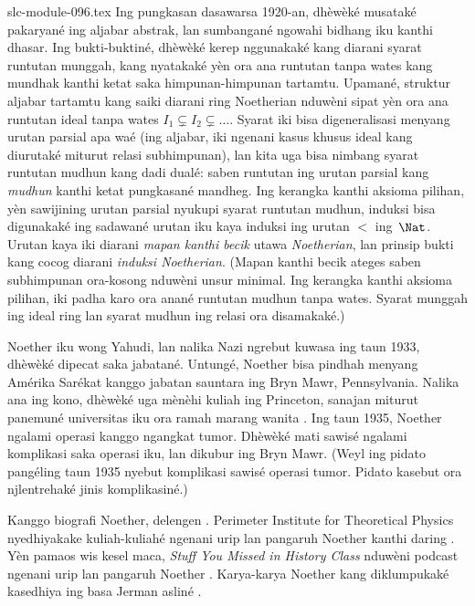 \begin{filecontents*}[overwrite]{slc-module-096.tex}
Ing pungkasan dasawarsa 1920-an,
dhèwèké musataké pakaryané ing
aljabar abstrak, lan sumbangané
ngowahi bidhang iku kanthi dhasar.
Ing bukti-buktiné, dhèwèké kerep
nggunakaké kang diarani syarat
runtutan munggah, kang nyatakaké
yèn ora ana runtutan tanpa wates
kang mundhak kanthi ketat saka
himpunan-himpunan tartamtu. Upamané,
struktur aljabar tartamtu kang
saiki diarani ring Noetherian
nduwèni sipat yèn ora ana
runtutan ideal tanpa wates
$I_1 \subsetneq I_2 \subsetneq \dots$.
Syarat iki bisa digeneralisasi
menyang urutan parsial apa waé
(ing aljabar, iki ngenani kasus
khusus ideal kang diurutaké
miturut relasi subhimpunan), lan
kita uga bisa nimbang syarat
runtutan mudhun kang dadi dualé:
saben runtutan ing urutan parsial
kang \emph{mudhun} kanthi ketat
pungkasané mandheg. Ing kerangka kanthi aksioma pilihan, yèn sawijining
urutan parsial nyukupi syarat
runtutan mudhun, induksi bisa
digunakaké ing sadawané urutan
iku kaya induksi ing urutan
$<$ ing~$\Nat$. Urutan kaya
iki diarani \emph{mapan kanthi becik}
utawa \emph{Noetherian}, lan
prinsip bukti kang cocog diarani
\emph{induksi Noetherian}.
(Mapan kanthi becik ateges saben subhimpunan ora-kosong nduwèni unsur minimal. Ing kerangka kanthi aksioma pilihan, iki padha karo ora anané runtutan mudhun tanpa wates. Syarat munggah ing ideal ring lan syarat mudhun ing relasi ora disamakaké.)

Noether iku wong Yahudi, lan
nalika Nazi ngrebut kuwasa ing
taun 1933, dhèwèké dipecat
saka jabatané. Untungé,
Noether bisa pindhah menyang
Amérika Sarékat kanggo
jabatan sauntara ing Bryn Mawr,
Pennsylvania. Nalika ana ing
kono, dhèwèké uga mènèhi
kuliah ing Princeton, sanajan
miturut panemuné universitas
iku ora ramah marang wanita
\citep[81]{Dick1981}. Ing taun
1935, Noether ngalami operasi
kanggo ngangkat tumor.
Dhèwèké mati sawisé ngalami
komplikasi saka operasi
iku, lan dikubur ing Bryn Mawr.
(Weyl ing pidato pangéling taun 1935 nyebut komplikasi sawisé operasi tumor. Pidato kasebut ora njlentrehaké jinis komplikasiné.)

\begin{reading}
Kanggo biografi Noether, delengen
\citet{Dick1981}. Perimeter
Institute for Theoretical Physics
nyedhiyakake kuliah-kuliahé
ngenani urip lan pangaruh
Noether kanthi daring
\citep{Perimeter2015}.
Yèn pamaos wis kesel maca,
\emph{Stuff You Missed in History Class}
nduwèni podcast ngenani urip
lan pangaruh Noether
\citep{Frey2015}. Karya-karya
Noether kang diklumpukaké
kasedhiya ing basa Jerman
asliné \citep{Noether1983}.
\end{reading}


\end{filecontents*}

